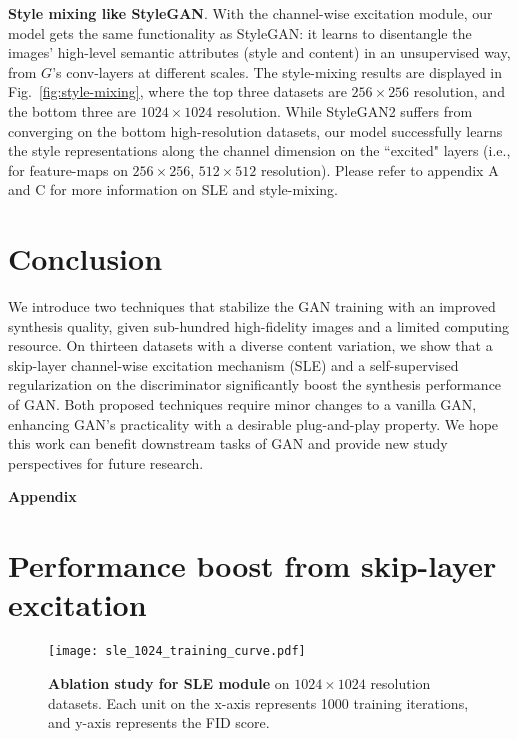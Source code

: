 \documentclass{article} \usepackage{iclr2021_conference,times}
\begin{document}
\textbf{Style mixing like StyleGAN}. With the channel-wise excitation module, our model gets the same functionality as StyleGAN: it learns to disentangle the images' high-level semantic attributes (style and content) in an unsupervised way, from $G$'s conv-layers at different scales. The style-mixing results are displayed in Fig.~\ref{fig:style-mixing}, where the top three datasets are $256\times256$ resolution, and the bottom three are $1024\times1024$ resolution. While StyleGAN2 suffers from converging on the bottom high-resolution datasets, our model successfully learns the style representations along the channel dimension on the ``excited" layers (i.e., for feature-maps on $256\times256$, $512\times512$ resolution). Please refer to appendix A and C for more information on SLE and style-mixing.




\section{Conclusion}
We introduce two techniques that stabilize the GAN training with an improved synthesis quality, given sub-hundred high-fidelity images and a limited computing resource. On thirteen datasets with a diverse content variation, we show that a skip-layer channel-wise excitation mechanism (SLE) and a self-supervised regularization on the discriminator significantly boost the synthesis performance of GAN. Both proposed techniques require minor changes to a vanilla GAN, enhancing GAN's practicality with a desirable plug-and-play property. We hope this work can benefit downstream tasks of GAN \citep{liu2020oogan,Liu_2020_ACCV,elgammal2017can} and provide new study perspectives for future research.







\clearpage

\appendix

\noindent\textbf{Appendix}


\section{Performance boost from skip-layer excitation}

\begin{figure}[h]
\centering
\texttt{[image: sle\_1024\_training\_curve.pdf]}
\caption{\textbf{Ablation study for SLE module} on $1024\times1024$ resolution datasets. Each unit on the x-axis represents 1000 training iterations, and y-axis represents the FID score. }
\label{fig:sle-curve}
\end{figure}
\end{document}
